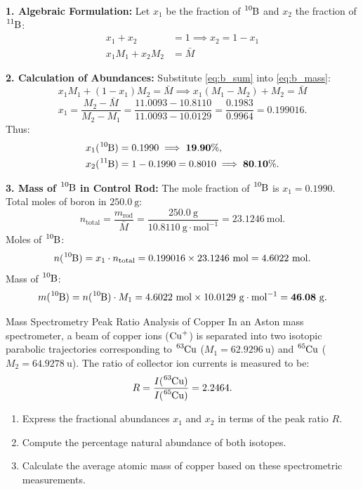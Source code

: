 \begin{tabletworkspace}[5.0cm]
\end{tabletworkspace}

\begin{solution}
\textbf{1. Algebraic Formulation:}
Let $x_1$ be the fraction of $\ce{^{10}B}$ and $x_2$ the fraction of $\ce{^{11}B}$:
\begin{align}
x_1 + x_2 &= 1 \implies x_2 = 1 - x_1 \label{eq:b_sum} \\
x_1 M_1 + x_2 M_2 &= \bar{M} \label{eq:b_mass}
\end{align}

\textbf{2. Calculation of Abundances:}
Substitute \eqref{eq:b_sum} into \eqref{eq:b_mass}:
\[
x_1 M_1 + (1 - x_1) M_2 = \bar{M} \implies x_1(M_1 - M_2) + M_2 = \bar{M}
\]
\[
x_1 = \frac{M_2 - \bar{M}}{M_2 - M_1} = \frac{11.0093 - 10.8110}{11.0093 - 10.0129} = \frac{0.1983}{0.9964} = 0.199016.
\]
Thus:
\begin{align*}
x_1(\ce{^{10}B}) &= 0.1990 \implies \mathbf{19.90\%}, \\
x_2(\ce{^{11}B}) &= 1 - 0.1990 = 0.8010 \implies \mathbf{80.10\%}.
\end{align*}

\textbf{3. Mass of $\ce{^{10}B}$ in Control Rod:}
The mole fraction of $\ce{^{10}B}$ is $x_1 = 0.1990$.
Total moles of boron in $250.0\ \mathrm{g}$:
\[
n_{\text{total}} = \frac{m_{\text{rod}}}{\bar{M}} = \frac{250.0\ \mathrm{g}}{10.8110\ \mathrm{g\cdot mol^{-1}}} = 23.1246\ \mathrm{mol}.
\]
Moles of $\ce{^{10}B}$:
\[
n(\ce{^{10}B}) = x_1 \cdot n_{\text{total}} = 0.199016 \times 23.1246\ \mathrm{mol} = 4.6022\ \mathrm{mol}.
\]
Mass of $\ce{^{10}B}$:
\[
m(\ce{^{10}B}) = n(\ce{^{10}B}) \cdot M_1 = 4.6022\ \mathrm{mol} \times 10.0129\ \mathrm{g\cdot mol^{-1}} = \mathbf{46.08\ \mathrm{g}}.
\]
\end{solution}

\begin{exercise}{Mass Spectrometry Peak Ratio Analysis of Copper}
In an Aston mass spectrometer, a beam of copper ions ($\ce{Cu+}$) is separated into two isotopic parabolic trajectories corresponding to $\ce{^{63}Cu}$ ($M_1 = 62.9296\ \mathrm{u}$) and $\ce{^{65}Cu}$ ($M_2 = 64.9278\ \mathrm{u}$). The ratio of collector ion currents is measured to be:
\[
R = \frac{I(\ce{^{63}Cu})}{I(\ce{^{65}Cu})} = 2.2464.
\]
\begin{enumerate}[leftmargin=1.5em,itemsep=2pt]
  \item Express the fractional abundances $x_1$ and $x_2$ in terms of the peak ratio $R$.
  \item Compute the percentage natural abundance of both isotopes.
  \item Calculate the average atomic mass of copper based on these spectrometric measurements.
\end{enumerate}
\end{exercise}

